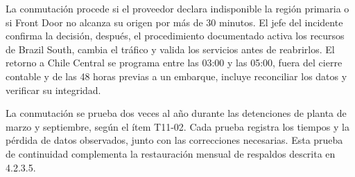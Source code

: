 \documentclass[subdoc]{../../comun/overfore}
\begin{document}
La conmutación procede si el proveedor declara indisponible la región primaria o si Front Door no alcanza su origen por más de 30 minutos. El jefe del incidente confirma la decisión, después, el procedimiento documentado activa los recursos de Brazil South, cambia el tráfico y valida los servicios antes de reabrirlos. El retorno a Chile Central se programa entre las 03:00 y las 05:00, fuera del cierre contable y de las 48 horas previas a un embarque, incluye reconciliar los datos y verificar su integridad.

La conmutación se prueba dos veces al año durante las detenciones de planta de marzo y septiembre, según el ítem T11-02. Cada prueba registra los tiempos y la pérdida de datos observados, junto con las correcciones necesarias. Esta prueba de continuidad complementa la restauración mensual de respaldos descrita en 4.2.3.5.
\end{document}
